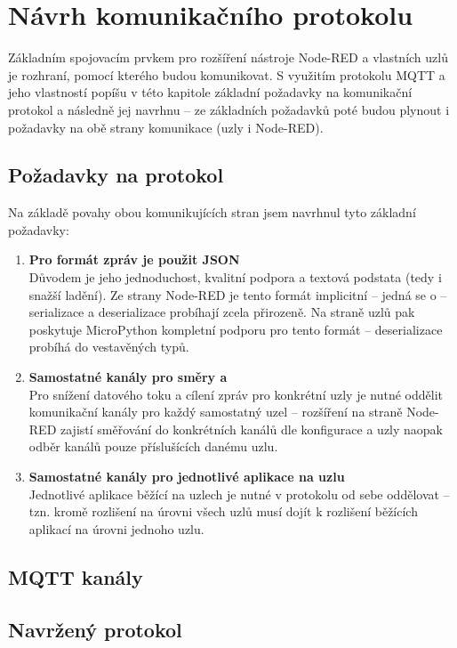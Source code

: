 \chapter{Návrh komunikačního protokolu}
\label{ch:protokol}

Základním spojovacím prvkem pro rozšíření nástroje Node-RED a vlastních uzlů je rozhraní, pomocí kterého budou
komunikovat.
S využitím protokolu MQTT a jeho vlastností popíšu v této kapitole základní požadavky na komunikační protokol a
následně jej navrhnu -- ze základních požadavků poté budou plynout i požadavky na obě strany komunikace (uzly i
Node-RED).

\section{Požadavky na protokol}\label{sec:pozadavky-na-protokol}
Na základě povahy obou komunikujících stran jsem navrhnul tyto základní požadavky:
\begin{enumerate}
    \item \textbf{Pro formát zpráv je použit JSON} \\
    Důvodem je jeho jednoduchost, kvalitní podpora a textová podstata (tedy i snažší ladění).
    Ze strany Node-RED je tento formát implicitní -- jedná se o  -- serializace a
    deserializace probíhají zcela přirozeně.
    Na straně uzlů pak poskytuje MicroPython kompletní podporu pro tento formát -- deserializace probíhá do
    vestavěných typů.

    \item \textbf{Samostatné kanály pro směry  a } \\
    Pro snížení datového toku a cílení zpráv pro konkrétní uzly je nutné oddělit komunikační kanály pro každý
    samostatný uzel -- rozšíření na straně Node-RED zajistí směřování do konkrétních kanálů dle konfigurace a uzly
    naopak odběr kanálů pouze příslušících danému uzlu.

    \item \textbf{Samostatné kanály pro jednotlivé aplikace na uzlu}  \\
    Jednotlivé aplikace běžící na uzlech je nutné v protokolu od sebe oddělovat -- tzn. kromě rozlišení na úrovni
    všech uzlů musí dojít k rozlišení běžících aplikací na úrovni jednoho uzlu.
\end{enumerate}


\section{MQTT kanály}


\section{Navržený protokol}


